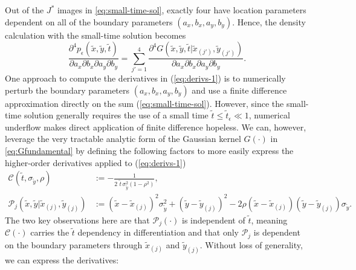 Out of the $J^*$ images in \eqref{eq:small-time-sol}, exactly four
have location parameters dependent on all of the boundary parameters
$(a_x, b_x, a_y, b_y)$. Hence, the density calculation with the
small-time solution becomes
\begin{equation}
  \frac{\partial^4 p_\epsilon(\tilde{x}, \tilde{y}, \tilde{t})}{\partial a_x \partial b_x \partial a_y \partial b_y}  = \sum_{j'=1}^{4}
                                                                                                                        \frac{\partial^4G(\tilde{x},\tilde{y},\tilde{t}|\tilde{x}_{(j')},\tilde{y}_{(j')})}{\partial a_x \partial b_x \partial a_y \partial b_y}. \label{eq:derivs-1}
\end{equation}
One approach to compute the derivatives in (\ref{eq:derivs-1}) is to
numerically perturb the boundary parameters $(a_x,b_x,a_y,b_y)$ and
use a finite difference approximation directly on the sum
(\ref{eq:small-time-sol}). However, since the small-time solution
generally requires the use of a small time
$\tilde{t} \leq \tilde{t}_\epsilon \ll 1$, numerical underflow makes
direct application of finite difference hopeless.  We can, however,
leverage the very tractable analytic form of the Gaussian kernel
$G(\cdot)$ in \eqref{eq:Gfundamental} by defining the following
factors to more easily express the higher-order derivatives applied to
(\ref{eq:derivs-1})
\begin{align}
  \mathcal{C}(\tilde{t}, \sigma_{\tilde{y}}, \rho) &:= -\frac{1}{2\,\,\tilde{t}\, \sigma_{\tilde{y}}^2 (1-\rho^2)}, \\
  \mathcal{P}_j(\tilde{x},\tilde{y} | \tilde{x}_{(j)}, \tilde{y}_{(j)}) &:= \left(\tilde{x}- \tilde{x}_{(j)}\right)^2 \sigma_{\tilde{y}}^2 + \left(\tilde{y}-\tilde{y}_{(j)}\right)^2 - 2\rho(\tilde{x}-\tilde{x}_{(j)})(\tilde{y}-\tilde{y}_{(j)})\sigma_{\tilde{y}}.
\end{align}
The two key observations here are that $\mathcal{P}_j(\cdot)$ is
independent of $\tilde{t}$, meaning $\mathcal{C}(\cdot)$ carries the
$\tilde{t}$ dependency in differentiation and that only
$\mathcal{P}_j$ is dependent on the boundary parameters through
$\tilde{x}_{(j)}$ and $\tilde{y}_{(j)}$. Without loss of generality,
we can express the derivatives:
